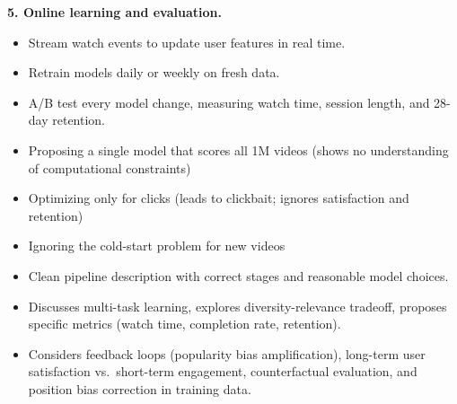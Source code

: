 \begin{interviewq}
\textbf{5. Online learning and evaluation.}
\begin{itemize}
    \item Stream watch events to update user features in real time.
    \item Retrain models daily or weekly on fresh data.
    \item A/B test every model change, measuring watch time, session length, and 28-day retention.
\end{itemize}

\redflags
\begin{itemize}
    \item Proposing a single model that scores all 1M videos (shows no understanding of computational constraints)
    \item Optimizing only for clicks (leads to clickbait; ignores satisfaction and retention)
    \item Ignoring the cold-start problem for new videos
\end{itemize}


\goodgreat
\begin{itemize}
    \item {} Clean pipeline description with correct stages and reasonable model choices.
    \item {} Discusses multi-task learning, explores diversity-relevance tradeoff, proposes specific metrics (watch time, completion rate, retention).
    \item {} Considers feedback loops (popularity bias amplification), long-term user satisfaction vs.\ short-term engagement, counterfactual evaluation, and position bias correction in training data.
\end{itemize}

\end{interviewq}

